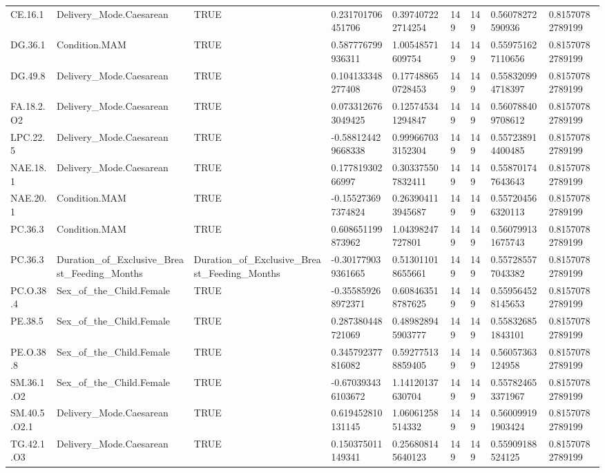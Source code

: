 \begin{longtable}{lllllllll}
CE.16.1 & Delivery\_Mode.Caesarean & TRUE & 0.231701706451706 & 0.397407222714254 & 149 & 149 & 0.56078272590936 & 0.81570782789199 \\
DG.36.1 & Condition.MAM & TRUE & 0.587776799936311 & 1.00548571609754 & 149 & 149 & 0.559751627110656 & 0.81570782789199 \\
DG.49.8 & Delivery\_Mode.Caesarean & TRUE & 0.104133348277408 & 0.177488650728453 & 149 & 149 & 0.558320994718397 & 0.81570782789199 \\
FA.18.2.O2 & Delivery\_Mode.Caesarean & TRUE & 0.0733126763049425 & 0.125745341294847 & 149 & 149 & 0.560788409708612 & 0.81570782789199 \\
LPC.22.5 & Delivery\_Mode.Caesarean & TRUE & -0.588124429668338 & 0.999667033152304 & 149 & 149 & 0.557238914400485 & 0.81570782789199 \\
NAE.18.1 & Delivery\_Mode.Caesarean & TRUE & 0.17781930266997 & 0.303375507832411 & 149 & 149 & 0.558701747643643 & 0.81570782789199 \\
NAE.20.1 & Condition.MAM & TRUE & -0.155273697374824 & 0.263904113945687 & 149 & 149 & 0.557204566320113 & 0.81570782789199 \\
PC.36.3 & Condition.MAM & TRUE & 0.608651199873962 & 1.04398247727801 & 149 & 149 & 0.560799131675743 & 0.81570782789199 \\
PC.36.3 & Duration\_of\_Exclusive\_Breast\_Feeding\_Months & Duration\_of\_Exclusive\_Breast\_Feeding\_Months & -0.301779039361665 & 0.513011018655661 & 149 & 149 & 0.557285577043382 & 0.81570782789199 \\
PC.O.38.4 & Sex\_of\_the\_Child.Female & TRUE & -0.355859268972371 & 0.608463518787625 & 149 & 149 & 0.559564528145653 & 0.81570782789199 \\
PE.38.5 & Sex\_of\_the\_Child.Female & TRUE & 0.287380448721069 & 0.489828945903777 & 149 & 149 & 0.558326851843101 & 0.81570782789199 \\
PE.O.38.8 & Sex\_of\_the\_Child.Female & TRUE & 0.345792377816082 & 0.592775138859405 & 149 & 149 & 0.56057363124958 & 0.81570782789199 \\
SM.36.1.O2 & Sex\_of\_the\_Child.Female & TRUE & -0.670393436103672 & 1.14120137630704 & 149 & 149 & 0.557824653371967 & 0.81570782789199 \\
SM.40.5.O2.1 & Delivery\_Mode.Caesarean & TRUE & 0.619452810131145 & 1.06061258514332 & 149 & 149 & 0.560099191903424 & 0.81570782789199 \\
TG.42.1.O3 & Delivery\_Mode.Caesarean & TRUE & 0.150375011149341 & 0.256808145640123 & 149 & 149 & 0.55909188524125 & 0.81570782789199 \\

\end{longtable}
